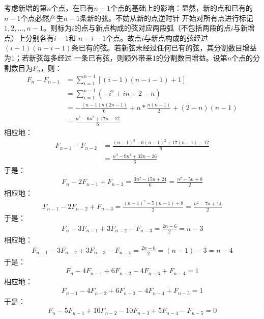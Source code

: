 \begin{solution}
    考虑新增的第$n$个点，在已有$n-1$个点的基础上的影响：显然，新的点和已有的$n-1$个点必然产生$n-1$条新的弦。不妨从新的点逆时针
    开始对所有点进行标记$1,2,\ldots, n-1$。则标为$i$的点与新点构成的弦对应两段弧（不包括两段的点$i$与新增点）上分别各有$i-1$和
    $n-i-1$个点。故点$i$与新点构成的弦经过$(i-1)(n-i-1)$条已有的弦。若新弦未经过任何已有的弦，其分割数目增益为1；若新弦每多经过
    一条已有弦，则额外带来1的分割数目增益。设第$n$个点的分割数目为$F_n$，则：
    \begin{align*}
        F_n-F_{n-1} &= \sum_{i=1}^{n-1} \left[(i-1)(n-i-1)+1\right] \\
        &= \sum_{i=1}^{n-1} \left(-i^2+in+2-n\right)\\
        &= - \frac{(n-1) n (2n-1)}{6} + n*\frac{n (n-1)}{2} + (2-n)(n-1)\\
        &= \frac{n^3-6n^2+17n-12}{6}
    \end{align*}
    相应地：
    \begin{align*}
        F_{n-1}-F_{n-2} &= \frac{(n-1)^3-6(n-1)^2+17(n-1)-12}{6}\\
        &= \frac{n^3-9n^2+32n-36}{6}
    \end{align*}
    于是：
    \begin{align*}
        F_n-2F_{n-1}+F_{n-2} = \frac{3n^2-15n+24}{6} = \frac{n^2-5n+8}{2}
    \end{align*}
    相应地：
    \begin{align*}
        F_{n-1}-2F_{n-2}+F_{n-3} = \frac{(n-1)^2-5(n-1)+8}{2} = \frac{n^2-7n+14}{2}
    \end{align*}
    于是：
    \begin{align*}
        F_n-3F_{n-1}+3F_{n-2}-F_{n-3} = \frac{2n-6}{2} = n-3
    \end{align*}
    相应地：
    \begin{align*}
        F_{n-1}-3F_{n-2}+3F_{n-3}-F_{n-4} = \frac{2n-6}{2} = (n-1)-3=n-4
    \end{align*}
    于是：
    \begin{align*}
        F_n-4F_{n-1}+6F_{n-2}-4F_{n-3}+F_{n-4} = 1
    \end{align*}
    相应地：
    \begin{align*}
        F_{n-1}-4F_{n-2}+6F_{n-3}-4F_{n-4}+F_{n-5} = 1
    \end{align*}
    于是：
    \begin{align*}
        F_n-5F_{n-1}+10F_{n-2}-10F_{n-3}+5F_{n-4}-F_{n-5} = 0
    \end{align*}

\end{solution}
